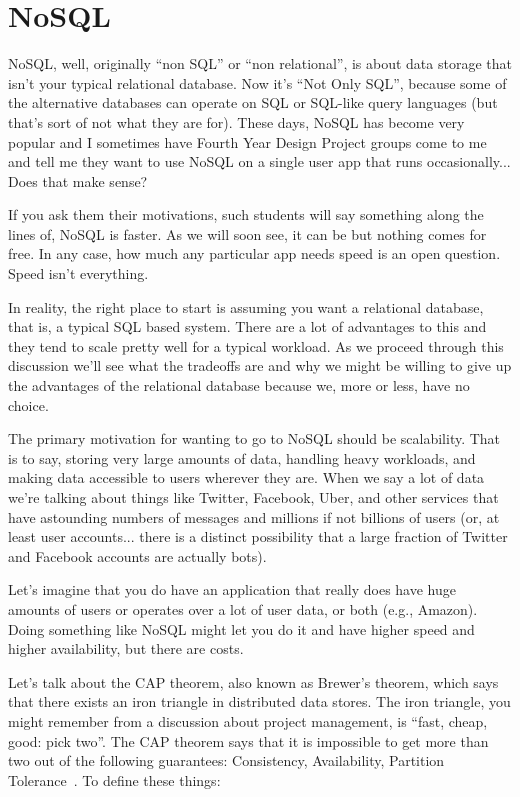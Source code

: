 




\section*{NoSQL}

NoSQL, well, originally ``non SQL'' or ``non relational'', is about data storage that isn't your typical relational database. Now it's ``Not Only SQL'', because some of the alternative databases can operate on SQL or SQL-like query languages (but that's sort of not what they are for). These days, NoSQL has become very popular and I sometimes have Fourth Year Design Project groups come to me and tell me they want to use NoSQL on a single user app that runs occasionally... Does that make sense?

If you ask them their motivations, such students will say something along the lines of, NoSQL is faster. As we will soon see, it can be but nothing comes for free. In any case, how much any particular app needs speed is an open question. Speed isn't everything. 

In reality, the right place to start is assuming you want a relational database, that is, a typical SQL based system. There are a lot of advantages to this and they tend to scale pretty well for a typical workload. As we proceed through this discussion we'll see what the tradeoffs are and why we might be willing to give up the advantages of the relational database because we, more or less, have no choice.

The primary motivation for wanting to go to NoSQL should be scalability. That is to say, storing very large amounts of data, handling heavy workloads, and making data accessible to users wherever they are. When we say a lot of data we're talking about things like Twitter, Facebook, Uber, and other services that have astounding numbers of messages and millions if not billions of users (or, at least user accounts... there is a distinct possibility that a large fraction of Twitter and Facebook accounts are actually bots). 

Let's imagine that you do have an application that really does have huge amounts of users or operates over a lot of user data, or both (e.g., Amazon). Doing something like NoSQL might let you do it and have higher speed and higher availability, but there are costs. 

Let's talk about the CAP theorem, also known as Brewer's theorem, which says that there exists an iron triangle in distributed data stores. The iron triangle, you might remember from a discussion about project management, is ``fast, cheap, good: pick two''. The CAP theorem says that it is impossible to get more than two out of the following guarantees: Consistency, Availability, Partition Tolerance~\cite{brewercap}. To define these things:


